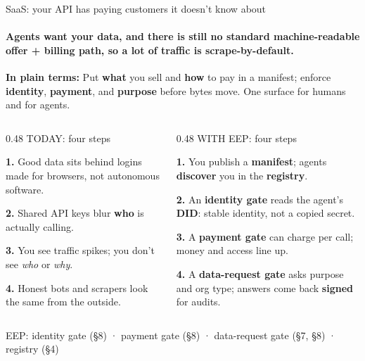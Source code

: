 \documentclass[aspectratio=169,10pt]{beamer}
\begin{document}
\begin{frame}{SaaS: your API has paying customers it doesn't know about}
\framesubtitle{Agents want your data, and there is still no standard machine-readable \textbf{offer} + \textbf{billing} path, so a lot of traffic is scrape-by-default.}

\vspace{0.08cm}
{\small\color{amber}\textbf{In plain terms:}\; Put \textbf{what} you sell and \textbf{how} to pay in a manifest; enforce \textbf{identity}, \textbf{payment}, and \textbf{purpose} before bytes move. One surface for humans and for agents.}

\vspace{0.08cm}
\begin{columns}[T]
\begin{column}{0.48\textwidth}
{\small\color{rose} TODAY: four steps}\par
\vspace{2pt}
{\small\color{txtm}%
\textbf{1.}\; Good data sits behind logins made for browsers, not autonomous software.\par
\textbf{2.}\; Shared API keys blur \textbf{who} is actually calling.\par
\textbf{3.}\; You see traffic spikes; you don't see \emph{who} or \emph{why}.\par
\textbf{4.}\; Honest bots and scrapers look the same from the outside.\par
}
\end{column}

\begin{column}{0.48\textwidth}
{\small\color{mint} WITH EEP: four steps}\par
\vspace{2pt}
{\small\color{txtm}%
\textbf{1.}\; You publish a \textbf{manifest}; agents \textbf{discover} you in the \textbf{registry}.\par
\textbf{2.}\; An \textbf{identity gate} reads the agent's \textbf{DID}: stable identity, not a copied secret.\par
\textbf{3.}\; A \textbf{payment gate} can charge per call; money and access line up.\par
\textbf{4.}\; A \textbf{data-request gate} asks purpose and org type; answers come back \textbf{signed} for audits.\par
}
\end{column}
\end{columns}

\vspace{4pt}
{\footnotesize\color{slate} EEP: identity gate (§8) · payment gate (§8) · data-request gate (§7, §8) · registry (§4)}
\end{frame}
\end{document}
